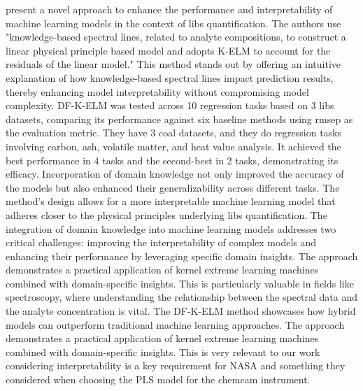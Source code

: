 \citet{song_DF-K-ELM} present a novel approach to enhance the performance and interpretability of machine learning models in the context of \gls{libs} quantification.
The authors use "knowledge-based spectral lines, related to analyte compositions, to construct a linear physical principle based model and adopts K-ELM to account for the residuals of the linear model."
This method stands out by offering an intuitive explanation of how knowledge-based spectral lines impact prediction results, thereby enhancing model interpretability without compromising model complexity.
DF-K-ELM was tested across 10 regression tasks based on 3 \gls{libs} datasets, comparing its performance against six baseline methods using \gls{rmsep} as the evaluation metric.
They have 3 coal datasets, and they do regression tasks involving carbon, ash, volatile matter, and heat value analysis.
It achieved the best performance in 4 tasks and the second-best in 2 tasks, demonstrating its efficacy.
Incorporation of domain knowledge not only improved the accuracy of the models but also enhanced their generalizability across different tasks.
The method's design allows for a more interpretable machine learning model that adheres closer to the physical principles underlying \gls{libs} quantification.
The integration of domain knowledge into machine learning models addresses two critical challenges: improving the interpretability of complex models and enhancing their performance by leveraging specific domain insights.
The approach demonstrates a practical application of kernel extreme learning machines combined with domain-specific insights.
This is particularly valuable in fields like spectroscopy, where understanding the relationship between the spectral data and the analyte concentration is vital.
The DF-K-ELM method showcases how hybrid models can outperform traditional machine learning approaches.
The approach demonstrates a practical application of kernel extreme learning machines combined with domain-specific insights.
This is very relevant to our work considering interpretability is a key requirement for NASA and something they considered when choosing the PLS model for the \gls{chemcam} instrument.

